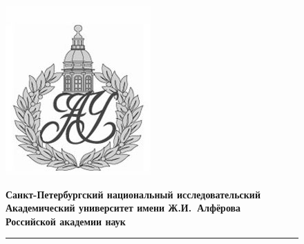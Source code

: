 \documentclass[ a4paper]{article}
\begin{document}
	\begin{figure}[htb]
		\begin{minipage}[c]{0.12\textwidth}
			\includegraphics[scale=0.25]{AU}
		\end{minipage}
		\hfill
		\begin{minipage}[t]{0.9\textwidth}
			{\Large\bfseries Санкт-Петербургский национальный исследовательский Академический университет имени Ж.И.~Алфёрова\\Российской академии наук}
		\end{minipage}
		\rule{164mm}{0.3mm}
	\end{figure}
	
\end{document}
